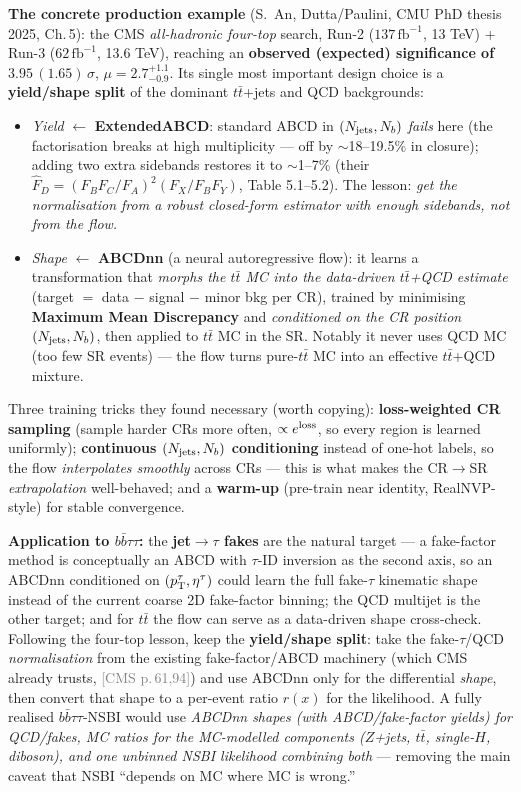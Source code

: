 \documentclass[11pt]{article}
\newcommand{\bbtt}{\ensuremath{b\bar b\tau\tau}}
\newcommand{\pC}[1]{\textcolor{gray}{\small[CMS p.\,#1]}}
\begin{document}
\noindent\textbf{The concrete production example} (S.~An, Dutta/Paulini, CMU PhD thesis 2025, Ch.\,5): the CMS
\emph{all-hadronic four-top} search, Run-2 ($137\,\mathrm{fb}^{-1}$, 13 TeV) + Run-3 ($62\,\mathrm{fb}^{-1}$,
13.6 TeV), reaching an \textbf{observed (expected) significance of $3.95\,(1.65)\,\sigma$}, $\mu=2.7^{+1.1}_{-0.9}$.
Its single most important design choice is a \textbf{yield/shape split} of the dominant $t\bar t$+jets and QCD
backgrounds:
\begin{itemize}
\item \emph{Yield} $\leftarrow$ \textbf{ExtendedABCD}: standard ABCD in $(N_{\rm jets},N_{b})$ \emph{fails} here
  (the factorisation breaks at high multiplicity --- off by $\sim$18--19.5\% in closure); adding two extra
  sidebands restores it to $\sim$1--7\% (their $\hat F_D=(F_BF_C/F_A)^2(F_X/F_BF_Y)$, Table 5.1--5.2). The lesson:
  \emph{get the normalisation from a robust closed-form estimator with enough sidebands, not from the flow.}
\item \emph{Shape} $\leftarrow$ \textbf{ABCDnn} (a neural autoregressive flow): it learns a transformation that
  \emph{morphs the $t\bar t$ MC into the data-driven $t\bar t$+QCD estimate} (target $=$ data $-$ signal $-$ minor
  bkg per CR), trained by minimising \textbf{Maximum Mean Discrepancy} and \emph{conditioned on the CR position
  $(N_{\rm jets},N_b)$}, then applied to $t\bar t$ MC in the SR. Notably it never uses QCD MC (too few SR events) ---
  the flow turns pure-$t\bar t$ MC into an effective $t\bar t$+QCD mixture.
\end{itemize}
Three training tricks they found necessary (worth copying): \textbf{loss-weighted CR sampling} (sample harder CRs
more often, $\propto e^{\rm loss}$, so every region is learned uniformly); \textbf{continuous $(N_{\rm jets},N_b)$
conditioning} instead of one-hot labels, so the flow \emph{interpolates smoothly} across CRs --- this is what makes
the CR$\to$SR \emph{extrapolation} well-behaved; and a \textbf{warm-up} (pre-train near identity, RealNVP-style) for
stable convergence.

\noindent\textbf{Application to \bbtt:} the \textbf{jet$\to\tau$ fakes} are the natural target --- a fake-factor
method is conceptually an ABCD with $\tau$-ID inversion as the second axis, so an ABCDnn conditioned on
$(p_{\rm T}^\tau,\eta^\tau)$ could learn the full fake-$\tau$ kinematic shape instead of the current coarse 2D
fake-factor binning; the QCD multijet is the other target; and for $t\bar t$ the flow can serve as a data-driven
shape cross-check. Following the four-top lesson, keep the \textbf{yield/shape split}: take the fake-$\tau$/QCD
\emph{normalisation} from the existing fake-factor/ABCD machinery (which CMS already trusts, \pC{61,94}) and use
ABCDnn only for the differential \emph{shape}, then convert that shape to a per-event ratio $r(x)$ for the
likelihood. A fully realised \bbtt-NSBI would use \emph{ABCDnn shapes (with ABCD/fake-factor yields) for QCD/fakes,
MC ratios for the MC-modelled components ($Z$+jets, $t\bar t$, single-$H$, diboson), and one unbinned NSBI
likelihood combining both} --- removing the main caveat that NSBI ``depends on MC where MC is wrong.''
\end{document}
